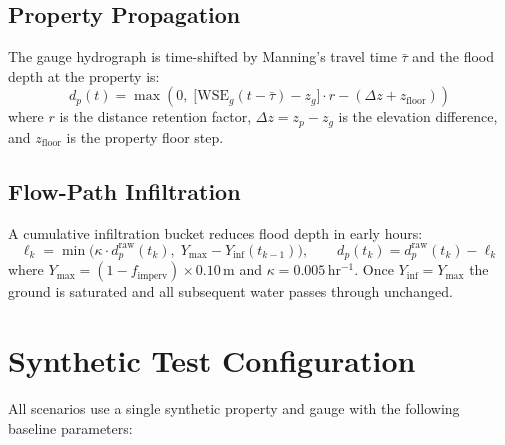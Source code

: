 \documentclass[11pt,a4paper]{article}
\begin{document}
\subsection{Property Propagation}
The gauge hydrograph is time-shifted by Manning's travel time $\bar{\tau}$ and the
flood depth at the property is:
\begin{equation}
    d_p(t) = \max\!\left(0,\; \bigl[\mathrm{WSE}_g(t - \bar{\tau}) - z_g\bigr] \cdot r
    - (\Delta z + z_{\mathrm{floor}})\right)
\end{equation}
where $r$ is the distance retention factor, $\Delta z = z_p - z_g$ is the
elevation difference, and $z_{\mathrm{floor}}$ is the property floor step.

\subsection{Flow-Path Infiltration}
A cumulative infiltration bucket reduces flood depth in early hours:
\begin{equation}
    \ell_k = \min\!\bigl(\kappa \cdot d_p^{\mathrm{raw}}(t_k),\; Y_{\max} - Y_{\mathrm{inf}}(t_{k-1})\bigr),
    \qquad
    d_p(t_k) = d_p^{\mathrm{raw}}(t_k) - \ell_k
\end{equation}
where $Y_{\max} = (1 - f_{\mathrm{imperv}}) \times 0.10$\,m and
$\kappa = 0.005$\,hr$^{-1}$.  Once $Y_{\mathrm{inf}} = Y_{\max}$ the ground is
saturated and all subsequent water passes through unchanged.

\section{Synthetic Test Configuration}

All scenarios use a single synthetic property and gauge with the following
baseline parameters:
\end{document}
